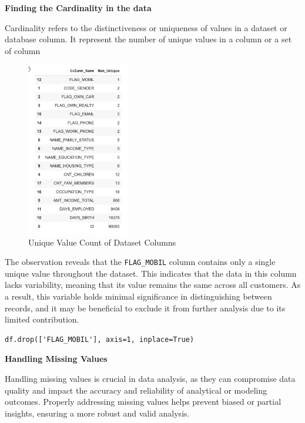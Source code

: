 \documentclass[12pt]{report}
\begin{document}
    {\bfseries Finding the Cardinality in the data}

    Cardinality refers to the distinctiveness or uniqueness of values in a dataset or database column. It represent the number of unique values in a column or a set of column

    \begin{figure}[h!]
        \centering
        \includegraphics[width=0.4\textwidth]{resources/pic/Unique Value Count of Dataset Columns.png}
        \caption{Unique Value Count of Dataset Columns}
        \label{Unique Value Count of Dataset Columns}
    \end{figure}

    The observation reveals that the \texttt{FLAG\_MOBIL} column contains only a single unique value throughout the dataset. This indicates that the data in this column lacks variability, meaning that its value remains the same across all customers. As a result, this variable holds minimal significance in distinguishing between records, and it may be beneficial to exclude it from further analysis due to its limited contribution.

    \begin{lstlisting}[style=default, language=python*, gobble=3]
        df.drop(['FLAG_MOBIL'], axis=1, inplace=True)
    \end{lstlisting}

    {\bfseries Handling Missing Values}

    Handling missing values is crucial in data analysis, as they can compromise data quality and impact the accuracy and reliability of analytical or modeling outcomes. Properly addressing missing values helps prevent biased or partial insights, ensuring a more robust and valid analysis.
\end{document}
